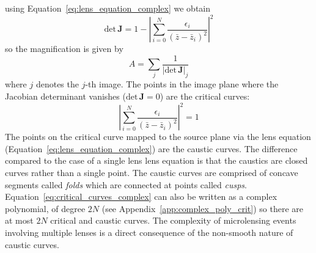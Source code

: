 \documentclass[12pt,dvipsnames]{report}
\begin{document}
using Equation~\ref{eq:lens_equation_complex} we obtain
\begin{equation}
    \mathrm{det} \,\mathbf J=1-\left|\sum_{i=0}^{N} \frac{\epsilon_{i}}{\left(\bar{z}-\bar{z}_i\right)^{2}}\right|^{2}
\end{equation}
so the magnification is given by
\begin{equation}
    A = \sum_j \frac{1}{\left|\mathrm{det}\,\mathbf J\right|_j}
\end{equation}
where $j$ denotes the $j$-th image. The points in the image plane where the Jacobian determinant vanishes
($\mathrm{det}\,\mathbf J=0$) are the critical curves:
\begin{equation}
    \left|\sum_{i=0}^{N} \frac{\epsilon_{i}}{\left(\bar{z}-\bar{z}_i\right)^{2}}\right|^{2}=1
    \label{eq:critical_curves_complex}
\end{equation}
The points on the critical curve mapped to the source plane via
the lens equation (Equation~\ref{eq:lens_equation_complex}) are the caustic curves.
The difference compared to the case of a single lens lens equation is that the caustics are closed curves
rather than a single point. The caustic curves are comprised of concave segments called \emph{folds} which are connected
at points called \emph{cusps}.
Equation~\ref{eq:critical_curves_complex} can also be written as a complex polynomial, of
degree $2N$ (see Appendix~\ref{app:complex_poly_crit}) so there are at most $2N$ critical and caustic curves.
The complexity of microlensing events involving multiple lenses is a direct consequence of the
non-smooth nature of caustic curves.
\end{document}
